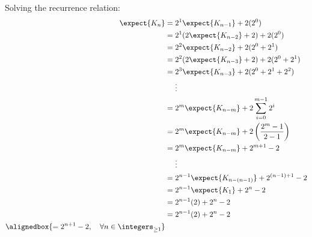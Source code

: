 \documentclass[hwnumber=5,studentnumber=20053722]{mthe353answer}
\begin{document}
\begin{questions}
\begin{solution}
      Solving the recurrence relation:
      \begin{align*}
        \expect{K_n} &= 2^1\expect{K_{n-1}} + 2(2^0)\\
        &= 2^1(2\expect{K_{n-2}} + 2) + 2(2^0)\\
        &= 2^2\expect{K_{n-2}} + 2(2^0 + 2^1)\\
        &= 2^2(2\expect{K_{n-3}} +2) + 2(2^0 + 2^1)\\
        &= 2^3\expect{K_{n-3}} + 2(2^0 + 2^1 + 2^2)\\
        &\phantom{{}={}}\vdots\\
        &= 2^m\expect{K_{n-m}} + 2\sum_{i=0}^{m-1} 2^i\\
        &= 2^m\expect{K_{n-m}} + 2\left(\frac{2^m-1}{2-1}\right)\\
        &= 2^m\expect{K_{n-m}} + 2^{m+1}-2\\
        &\phantom{{}={}}\vdots\\
        &= 2^{n-1}\expect{K_{n-(n-1)}} + 2^{(n-1)+1} - 2\\
        &= 2^{n-1}\expect{K_{1}} + 2^{n} - 2\\
        &= 2^{n-1}(2) + 2^{n} - 2\\
        &= 2^{n-1}(2) + 2^{n} - 2\\
        \alignedbox{= 2^{n+1} - 2, \quad \forall n \in \integers_{\ge 1}}
      \end{align*}
    \end{solution}
  \end{questions}
\end{document}

